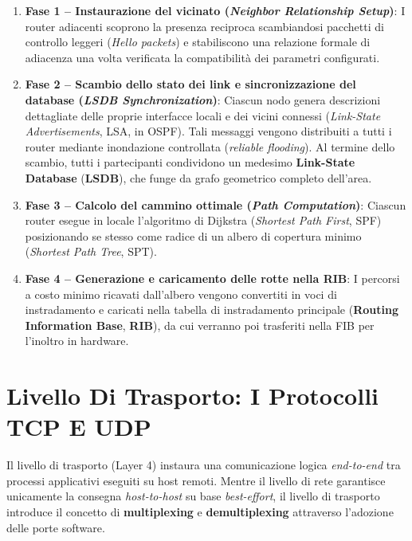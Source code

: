 \documentclass[11pt, a4paper]{article}
\begin{document}
\begin{enumerate}
    \item \textbf{Fase 1 -- Instaurazione del vicinato (\emph{Neighbor Relationship Setup})}: I router adiacenti scoprono la presenza reciproca scambiandosi pacchetti di controllo leggeri (\emph{Hello packets}) e stabiliscono una relazione formale di adiacenza una volta verificata la compatibilità dei parametri configurati.

    \item \textbf{Fase 2 -- Scambio dello stato dei link e sincronizzazione del database (\emph{LSDB Synchronization})}: Ciascun nodo genera descrizioni dettagliate delle proprie interfacce locali e dei vicini connessi (\emph{Link-State Advertisements}, LSA, in OSPF). Tali messaggi vengono distribuiti a tutti i router mediante inondazione controllata (\emph{reliable flooding}). Al termine dello scambio, tutti i partecipanti condividono un medesimo \textbf{Link-State Database} (\textbf{LSDB}), che funge da grafo geometrico completo dell'area.

    \item \textbf{Fase 3 -- Calcolo del cammino ottimale (\emph{Path Computation})}: Ciascun router esegue in locale l'algoritmo di Dijkstra (\emph{Shortest Path First}, SPF) posizionando se stesso come radice di un albero di copertura minimo (\emph{Shortest Path Tree}, SPT).

    \item \textbf{Fase 4 -- Generazione e caricamento delle rotte nella RIB}: I percorsi a costo minimo ricavati dall'albero vengono convertiti in voci di instradamento e caricati nella tabella di instradamento principale (\textbf{Routing Information Base}, \textbf{RIB}), da cui verranno poi trasferiti nella FIB per l'inoltro in hardware.
\end{enumerate}

\newpage

\section{Livello Di Trasporto: I Protocolli TCP E UDP}

Il livello di trasporto (Layer 4) instaura una comunicazione logica \emph{end-to-end} tra processi applicativi eseguiti su host remoti. Mentre il livello di rete garantisce unicamente la consegna \emph{host-to-host} su base \emph{best-effort}, il livello di trasporto introduce il concetto di \textbf{multiplexing} e \textbf{demultiplexing} attraverso l'adozione delle porte software.
\end{document}
